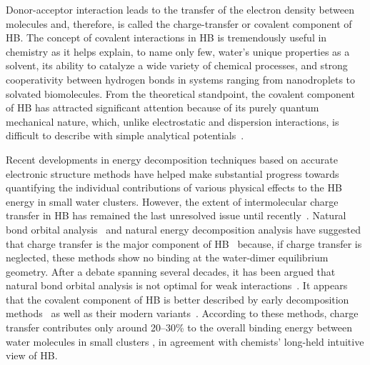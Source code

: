 \documentclass[aps,prl,reprint,amsmath,amssymb]{revtex4-1}
\begin{document}
Donor-acceptor interaction leads to the transfer of the electron density between molecules and, therefore, is called the charge-transfer or covalent component of HB. 
The concept of covalent interactions in HB is tremendously useful in chemistry 
as it helps explain, to name only few, water's unique properties as a solvent, its ability to catalyze a wide variety of chemical processes, and strong cooperativity between hydrogen bonds in systems ranging from nanodroplets to solvated biomolecules. 
From the theoretical standpoint, the covalent component of HB has attracted significant attention because of its purely quantum mechanical nature, which, unlike electrostatic and dispersion interactions, is difficult to describe with simple analytical potentials~\cite{lee2011effects, gordon2013accurate}.



Recent developments in energy decomposition techniques based on accurate electronic structure methods have helped make substantial progress towards quantifying the individual contributions of various physical effects to the HB energy in small water clusters. 
However, the extent of intermolecular charge transfer in HB has remained the last unresolved issue until recently~\cite{isaacs1999covalency,ghanty2000hydrogen,stone2017natural}. 
Natural bond orbital analysis~\cite{weinhold1998natural} and natural energy decomposition analysis \cite{glendening1994natural} have suggested that charge transfer is the major component of HB~\cite{schenter1996natural,glendening2005natural,weinhold2005resonance} because, if charge transfer is neglected, these methods show no binding at the water-dimer equilibrium geometry. 
After a debate spanning several decades, it has been argued that natural bond orbital analysis is not optimal for weak interactions~\cite{stone2017natural}. 
It appears that the covalent component of HB is better described by early decomposition methods~\cite{kitaura1976new,bagus1984new,bagus1992decomposition,stevens1987frozen,chen1996energy,stone1993imptct} as well as their modern variants~\cite{mo2000energy,misquitta2013charge,khaliullin2007unravelling,misquitta2013saptdftct}. 
According to these methods, charge transfer contributes only around 20--30\% to the overall binding energy between water molecules in small clusters \cite{stevens1987frozen,stone1993computation,chen1996energy,piquemal2005csov,khaliullin2009electron,cobar2012examination}, in agreement with chemists' long-held intuitive view of HB.
\end{document}
